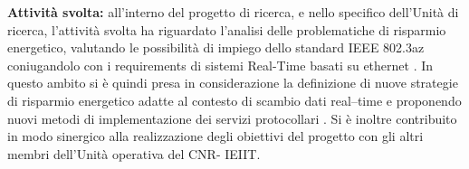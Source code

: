 {\textbf{Attività svolta:} all’interno del progetto di ricerca, e nello specifico dell’Unità di ricerca, l'attività svolta ha riguardato l’analisi delle problematiche di risparmio energetico, valutando le possibilità di impiego dello standard IEEE 802.3az coniugandolo con i requirements di sistemi  Real-Time basati su ethernet \cite{Tramarin:2013}. In questo ambito si è quindi presa in considerazione la  definizione di nuove strategie di risparmio energetico adatte al contesto di scambio dati real--time e proponendo nuovi metodi di implementazione dei servizi protocollari \cite{Vitturi:2015}. Si è inoltre contribuito in modo sinergico alla realizzazione degli obiettivi del progetto con gli altri membri dell’Unità operativa del CNR- IEIIT.}

